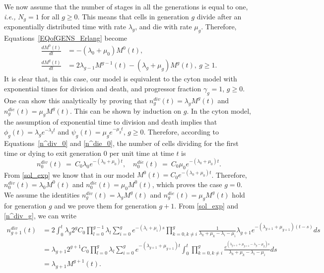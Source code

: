 \documentclass[10pt]{article}
\numberwithin{equation}{section}
\begin{document}
 We now assume that  the number of stages in all the generations is equal to one, {\em i.e.,} $N_g =1$ for all $g \ge 0$.
 This means that cells in generation $g$ divide after an exponentially distributed time with rate $\lambda_g$, and die with rate $\mu_g$. Therefore, Equations~\eqref{EQofGENS_Erlang} become 
\begin{equation}
\label{EQofGENS_exp}
    \begin{split}
        \frac{dM^0(t)}{dt} & = -\left(\lambda_0+\mu_0\right) M^0(t), \\
        \frac{dM^g(t)}{dt} & = 2 \lambda_{g-1} M^{g-1}(t) - \left(\lambda_g+\mu_g\right) M^g(t), \ g \ge 1.
    \end{split}
\end{equation}
It is clear that, in this case, our model is equivalent to the cyton model with exponential times for division and death, and progressor fraction $\gamma_g=1$, $g\geq 0$. One can show this analytically by proving that $n^{div}_{g}(t) = \lambda_g M^g(t)$ and $n^{die}_{g}(t) = \mu_g M^g(t)$.
This can be shown by induction on $g$. In the cyton model, the assumption of exponential time to division and death implies that $\phi_g(t) = \lambda_g e^{-\lambda_g t}$ and $\psi_g(t) = \mu_g e^{-\mu_g t}$, $g \ge 0$. Therefore, according to Equations~\eqref{n^div_0} and \eqref{n^die_0}, the number of cells dividing for the first time or dying to exit generation $0$ per unit time at time $t$ is
\begin{equation*}
    n^{div}_{0}(t) \ =\ C_0  \lambda_0 e^{-(\lambda_0+\mu_0) t}, \quad     n^{die}_{0}(t) \ = \ C_0 \mu_0 e^{-(\lambda_0+\mu_0) t}.
\end{equation*}
From \eqref{sol_exp} we know that in our model $M^0(t) = C_0 e^{-(\lambda_0+\mu_0) t}$. Therefore, $n^{div}_{0}(t)= \lambda_0 M^0(t)$ and $n^{die}_{0}(t)= \mu_0 M^0(t)$, which proves the case $g=0$. 
We assume the identities $n^{div}_{g}(t) = \lambda_g M^g(t)$ and $n^{die}_{g}(t) = \mu_g M^g(t)$ hold for generation $g$ and we prove them for generation $g+1$. From \eqref{sol_exp} and \eqref{n^div_g}, we can write
\begin{align*}
    n^{div}_{g+1}(t) & = 
    2 \int_0^t \lambda_g 
    2^g C_0 \prod_{l=0}^{g-1} \lambda_l \sum_{i=0}^g e^{-(\lambda_i + \mu_i)s} \prod_{k=0, k \neq i}^g \frac{1}{\lambda_k+\mu_k-\lambda_i-\mu_i}
    \lambda_{g+1} e^{-(\lambda_{g+1} + \mu_{g+1})(t-s)} ds \\
    & = \lambda_{g+1} 2^{g+1} C_0 \prod_{l=0}^g \lambda_l \sum_{i=0}^g 
    e^{-(\lambda_{g+1} + \mu_{g+1})t} \int_0^t 
    \prod_{k=0, k \neq i}^g
    \frac{e^{(\lambda_{g+1} + \mu_{g+1} - \lambda_g -\mu_g)s}}{\lambda_k+\mu_k-\lambda_i-\mu_i} ds \\
    & = \lambda_{g+1} M^{g+1}(t).
\end{align*}
\end{document}
